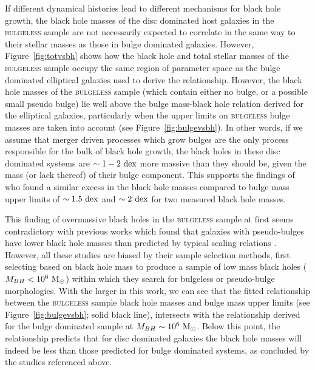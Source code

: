 {If different dynamical histories lead to different mechanisms for black hole growth, the black hole masses of the disc dominated host galaxies in the \textsc{bulgeless} sample are not necessarily expected to correlate in the same way to their stellar masses as those in bulge dominated galaxies. However, Figure~\ref{fig:totvsbh} shows how the black hole and total stellar masses of the \textsc{bulgeless} sample occupy the same region of parameter space as the bulge dominated elliptical galaxies used to derive the \citet{haringrix04} relationship. However, the black hole masses of the \textsc{bulgeless} sample (which contain either no bulge, or a possible small pseudo bulge) lie well above the bulge mass-black hole relation derived for the \citet{haringrix04} elliptical galaxies, particularly when the upper limits on \textsc{bulgeless} bulge masses are taken into account (see Figure~\ref{fig:bulgevsbh}). In other words, if we assume that merger driven processes which grow bulges are the only process responsible for the bulk of black hole growth, the black holes in these disc dominated systems are $\sim1-2~\rm{dex}$ more massive than they should be, given the mass (or lack thereof) of their bulge component. This supports the findings of \citet{Simmons13} who found a similar excess in the black hole masses compared to bulge mass upper limits of $\sim 1.5~\rm{dex}$ and $\sim 2~\rm{dex}$ for two measured black hole masses. 

This finding of overmassive black holes in the \textsc{bulgeless} sample at first seems contradictory with previous works which found that galaxies with pseudo-bulges have lower black hole masses than predicted by typical scaling relations \citep[see work by][]{greene08, hu09, jiang11a, mathur12, ho14}. However, all these studies are biased by their sample selection methods, first selecting based on black hole mass to produce a sample of low mass black holes ($M_{BH} < 10^6 ~\rm{M}_{\odot}$) within which they search for bulgeless or pseudo-bulge morphologies. With the larger in this work, we can see that the fitted relationship between the \textsc{bulgeless} sample black hole masses and bulge mass upper limits (see Figure~\ref{fig:bulgevsbh}; solid black line), intersects with the relationship derived for the bulge dominated \citet{haringrix04} sample at $M_{BH} \sim 10^{6} ~\rm{M}_{\odot}$. Below this point, the relationship predicts that for disc dominated galaxies the black hole masses will indeed be less than those predicted for bulge dominated systems, as concluded by the studies referenced above. 

}
